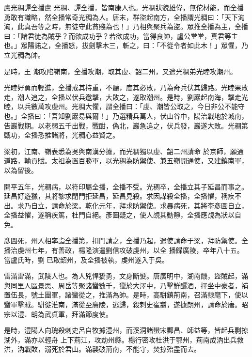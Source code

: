 
\begin{pinyinscope}

 盧光稠譚全播盧
 光稠、譚全播，皆南康人也。光稠狀貌雄偉，無佗材能，而全播勇敢有識略，然全播常奇光稠為人。唐末，群盜起南方，全播謂光稠曰：「天下洶洶，此真吾等之時，無徒守此貧賤為也！」乃相與聚兵為盜。眾推全播為主，全播曰：「諸君徒為賊乎？而欲成功乎？若欲成功，當得良帥，盧公堂堂，真君等主也。」眾陽諾之，全播怒，拔劍擊木三，斬之，曰：「不從令者如此木！」眾懼，乃立光稠為帥。



 是時，王
 潮攻陷嶺南，全播攻潮，取其虔、韶二州，又遣光稠弟光睦攻潮州。



 光睦好勇而輕進，全播戒其持重，不聽，度其必敗，乃為奇兵伏其歸路。光睦果敗走，潮人追之，全播以伏兵邀擊，大敗之，遂取潮州。是時，劉巖起南海，擊走光睦，以兵數萬攻虔州。光稠大懼，謂全播曰：「虔、潮皆公取之，今日非公不能守也。」全播曰：「吾知劉巖易與爾！」乃選精兵萬人，伏山谷中，陽治戰地於城南，告巖戰期。以老弱五千出戰，戰酣，偽北，巖急追之，伏兵發，巖遂大敗。光稠第戰功，全播悉推諸將，光稠心益賢之。



 梁初，江南、嶺表悉為吳與南漢分據，而光稠獨以虔、韶二州請命
 於京師，願通道路，輸貢賦。太祖為置百勝軍，以光稠為防禦使、兼五嶺開通使，又建鎮南軍，以為留後。



 開平五年，光稠病，以符印屬全播，全播不受。光稠卒，全播立其子延昌而事之。延昌好遊獵，其將黎求閉門拒延昌，延昌見殺。求因謀殺全播，全播懼，稱疾不出。求乃自立，請命於梁。乾化元年，拜求防禦使。求暴病死，其將李彥圖自立，全播益懼，遂稱疾篤，杜門自絕。彥圖疑之，使人覘其動靜，全播應覘為狀以自免。



 彥圖死，州人相率詣全播第，扣門請之，全播乃起，遣使請命于梁，拜防禦使。全播治虔州七年，有善政，楊隆演遣劉信攻破虔州，以全
 播歸廣陵，卒年八十五。當盧氏時，劉已取韶州，及全播被執，虔州遂入于吳。



 雷滿雷滿，武陵人也。為人兇悍獢勇，文身斷髮。唐廣明中，湖南饑，盜賊起，滿與同里人區景思、周岳等聚諸蠻數千，獵於大澤中，乃擊鮮釃酒，擇坐中豪者，補置伍長，號土團軍，諸蠻從之，推滿為帥。是時，高駢鎮荊南，召滿隸麾下，使以蠻軍擊賊。駢徙淮南，滿從至廣陵，逃歸，殺刺史崔翥，遂據朗州，請命於唐。昭宗以澧、朗為武貞軍，拜滿節度使。



 是時，澧陽人向瑰殺刺史呂自牧據澧州，而溪洞諸蠻宋鄴昌、師益等，皆起兵剽掠湖外，滿亦以輕舟
 上下荊江，攻劫州縣。楊行密攻杜洪于鄂州，荊南成汭出兵救洪，汭戰敗，溺死於君山。滿襲破荊南，不能守，焚掠殆盡而去。




\end{pinyinscope}
